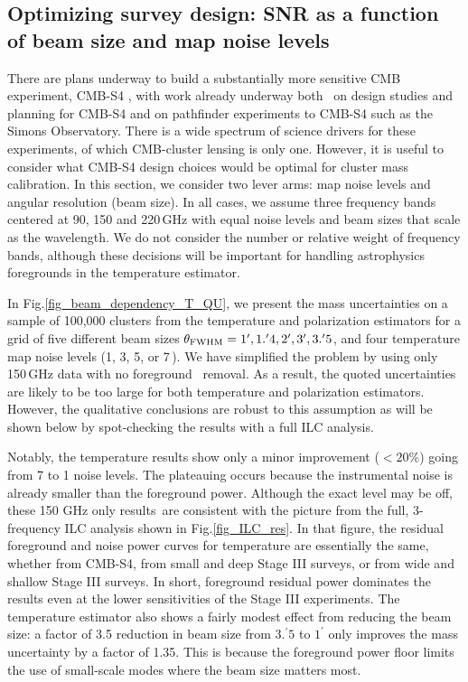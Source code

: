 \subsection{Optimizing survey design: SNR as a function of beam size and map noise levels}
\label{sec_beam_dependence}

There are plans underway to build a substantially more sensitive CMB experiment, CMB-S4 \citep{cmbs4-sb1}, with work already underway both \
on design studies and planning for CMB-S4 and on pathfinder experiments to CMB-S4 such as the Simons Observatory. There is a wide spectrum of science drivers for these experiments, of which CMB-cluster lensing is only one. However, it is useful to consider what CMB-S4 design choices would be optimal for cluster mass calibration. In this section, we consider two lever arms: map noise levels and angular resolution (beam size). In all cases, we assume three frequency bands centered at 90, 150 and 220\,GHz with equal noise levels and beam sizes that scale as the wavelength.                                                                                                                            
We do not consider the number or relative weight of frequency bands, although these decisions will be important for handling astrophysics foregrounds in the temperature estimator.

In Fig.\ref{fig_beam_dependency_T_QU}, we present the mass uncertainties on a sample of 100,000 clusters from the temperature and polarization estimators for a grid of five different beam sizes $\theta_{{\rm FWHM}} = 1^\prime, 1.^\prime4, 2^\prime, 3^\prime, 3.^\prime 5$, and four temperature map noise levels (1, 3, 5, or 7\,\ukarcmin{}). We have simplified the problem by using only 150\,GHz data with no foreground \
removal. As a result, the quoted uncertainties are likely to be too large for both temperature and polarization estimators.
However, the qualitative conclusions are robust to this assumption as will be shown below by spot-checking the results with a full ILC analysis.

Notably, the temperature results show only a minor improvement ($<20$\%) going from 7 to 1 \ukarcmin{} noise levels. The plateauing occurs because the instrumental noise is already smaller than the foreground power. Although the exact level may be off, these 150 GHz only results\
 are consistent with the picture from the full, 3-frequency ILC analysis shown in Fig.\ref{fig_ILC_res}. In that figure, the residual foreground and noise power curves for temperature are essentially the same, whether from CMB-S4, from small and deep Stage III surveys, or from wide and shallow Stage III surveys. In short, foreground residual power dominates the results even at the lower sensitivities of the Stage III experiments.
The temperature estimator also shows a fairly modest effect from reducing the beam size: a factor of 3.5 reduction in beam size from $3.^\prime5$ to $1^\prime$ only improves the mass uncertainty by a factor of 1.35. This is because the foreground power floor limits the use of small-scale modes where the beam size matters most.

